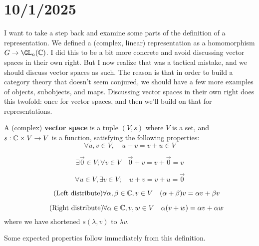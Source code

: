 \section*{10/1/2025}


I want to take a step back and examine some parts of the definition of a representation.
We defined a (complex, linear) representation as a homomorphism $G\to \GL_n(\C)$.
I did this to be a bit more concrete and avoid discussing vector spaces in their own right.
But I now realize that was a tactical mistake, and we should discuss vector spaces as such.
The reason is that in order to build a category theory that doesn't seem conjured,
we should have a few more examples of objects, subobjects, and maps.
Discussing vector spaces in their own right does this twofold: once for vector spaces, 
and then we'll build on that for representations.

\begin{definition}
    A (complex) {\bf vector space} is a tuple $(V, s)$ where $V$ is a set, 
    and $s:\mathbb{C} \times V \to V$ is a function,
    satisfying the following properties:
    \begin{equation*}\tag{Commutative addition}
        \forall u,v\in V, \quad u+v = v+u\in V
    \end{equation*}

    \begin{equation*}\tag{Zero}
        \exists \vec{0}\in V; \forall v\in V \quad \vec{0}+v = v+\vec{0} = v
    \end{equation*}

    \begin{equation*}\tag{Negative}
        \forall u\in V, \exists v\in V; \quad u+v = v+u = \vec{0}
    \end{equation*}

    \begin{equation*}\tag{Left distribute}
        \forall \alpha,\beta\in \mathbb{C}, v\in V \quad (\alpha+\beta)v = \alpha v + \beta v 
    \end{equation*}

    \begin{equation*}\tag{Right distribute}
        \forall \alpha\in \mathbb{C}, v,w\in V \quad \alpha(v+w) = \alpha v + \alpha w
    \end{equation*}
    where we have shortened $s(\lambda,v)$ to $\lambda v$.
\end{definition}

Some expected properties follow immediately from this definition.

